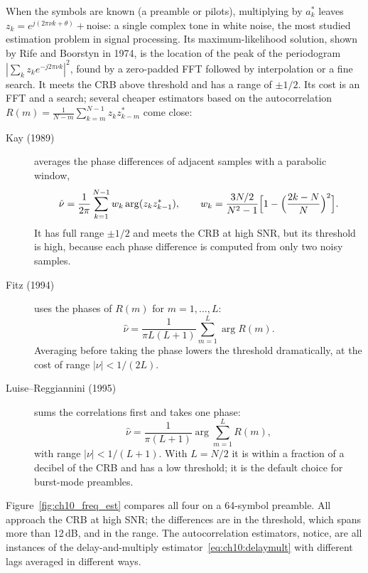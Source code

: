 When the symbols are known (a preamble or pilots), multiplying by $a_k^*$ leaves
$z_k=e^{j(2\pi\nu k+\theta)}+\text{noise}$: a single complex tone in white noise, the most studied
estimation problem in signal processing. Its maximum-likelihood solution, shown by Rife and Boorstyn
in 1974, is the location of the peak of the periodogram $|\sum_kz_ke^{-j2\pi\nu k}|^2$, found by a
zero-padded FFT followed by interpolation or a fine search. It meets the CRB above threshold and has a
range of $\pm1/2$. Its cost is an FFT and a search; several cheaper estimators based on
the autocorrelation $R(m)=\frac{1}{N-m}\sum_{k=m}^{N-1}z_kz_{k-m}^*$ come close:
\begin{description}
\item[Kay (1989)] averages the phase differences of adjacent samples with a parabolic window,
\[
\hat\nu=\frac{1}{2\pi}\sum_{k=1}^{N-1}w_k\arg(z_kz_{k-1}^*),\qquad
w_k=\frac{3N/2}{N^2-1}\Bigl[1-\Bigl(\frac{2k-N}{N}\Bigr)^2\Bigr].
\]
It has full range $\pm1/2$ and meets the
CRB at high SNR, but its threshold is high, because each phase difference is computed from only two
noisy samples.
\item[Fitz (1994)] uses the phases of $R(m)$ for $m=1,\dots,L$:
\[
\hat\nu=\frac{1}{\pi L(L+1)}\sum_{m=1}^{L}\arg R(m).
\]
Averaging before taking the phase lowers the
threshold dramatically, at the cost of range $|\nu|<1/(2L)$.
\item[Luise--Reggiannini (1995)] sums the correlations first and takes one phase:
\[
\hat\nu=\frac{1}{\pi(L+1)}\arg\sum_{m=1}^{L}R(m),
\]
with range $|\nu|<1/(L+1)$. With $L=N/2$ it is
within a fraction of a decibel of the CRB and has a low threshold; it is the default choice for
burst-mode preambles.
\end{description}
Figure~\ref{fig:ch10_freq_est} compares all four on a 64-symbol preamble. All approach the CRB at high
SNR; the differences are in the threshold, which spans more than 12\,dB, and in the range. The
autocorrelation estimators, notice, are all instances of the delay-and-multiply
estimator~\eqref{eq:ch10:delaymult} with different lags averaged in different ways.



